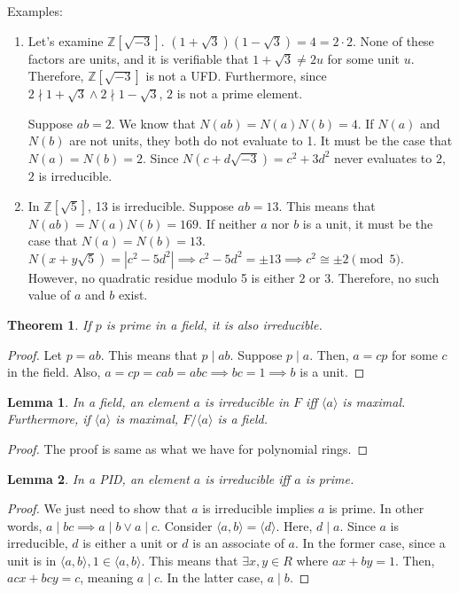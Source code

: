 \documentclass{article}
\theoremstyle{definition}
\theoremstyle{plain}
\newtheorem{theorem}{Theorem}
\theoremstyle{corollary}
\theoremstyle{lemma}
\newtheorem{lemma}{Lemma}
\begin{document}
Examples:
\begin{enumerate}
    \item Let's examine $\mathbb{Z}[\sqrt{-3}]$. $(1+\sqrt3)(1-\sqrt3)=4=2\cdot2$. None of these factors are units, and it is verifiable that $1+\sqrt3\neq2u$ for some unit $u$. Therefore, $\mathbb{Z}[\sqrt{-3}]$ is not a UFD. Furthermore, since $2\nmid 1+\sqrt3\land2\nmid1-\sqrt3$, $2$ is not a prime element.

    Suppose $ab=2$. We know that $N(ab)=N(a)N(b)=4$. If $N(a)$ and $N(b)$ are not units, they both do not evaluate to 1. It must be the case that $N(a)=N(b)=2$. Since $N(c+d\sqrt{-3})=c^2+3d^2$ never evaluates to $2$, $2$ is irreducible.
    \item In $\mathbb{Z}[\sqrt5]$, 13 is irreducible. Suppose $ab=13$. This means that $N(ab)=N(a)N(b)=169$. If neither $a$ nor $b$ is a unit, it must be the case that $N(a)=N(b)=13$. $N(x+y\sqrt5)=|c^2-5d^2|\implies c^2-5d^2=\pm13\implies c^2\cong\pm2\pmod5$. However, no quadratic residue modulo 5 is either $2$ or $3$. Therefore, no such value of $a$ and $b$ exist.
\end{enumerate}

\begin{theorem}
    If $p$ is prime in a field, it is also irreducible.
\end{theorem}

\begin{proof}
    Let $p=ab$. This means that $p\mid ab$. Suppose $p\mid a$. Then, $a=cp$ for some $c$ in the field. Also, $a=cp=cab=abc\implies bc=1\implies b$ is a unit.
\end{proof}

\begin{lemma}
    In a field, an element $a$ is irreducible in $F$ iff $\langle a\rangle$ is maximal. Furthermore, if $\langle a\rangle$ is maximal, $F/\langle a\rangle$ is a field.
\end{lemma}

\begin{proof}
    The proof is same as what we have for polynomial rings.
\end{proof}

\begin{lemma}
    In a PID, an element $a$ is irreducible iff $a$ is prime.
\end{lemma}

\begin{proof}
    We just need to show that $a$ is irreducible implies $a$ is prime. In other words, $a\mid bc\implies a\mid b\lor a\mid c$. Consider $\langle a,b\rangle=\langle d\rangle$. Here, $d\mid a$. Since $a$ is irreducible, $d$ is either a unit or $d$ is an associate of $a$. In the former case, since a unit is in $\langle a,b\rangle, 1\in\langle a,b\rangle$. This means that $\exists x,y\in R$ where $ax+by=1$. Then, $acx+bcy=c$, meaning $a\mid c$. In the latter case, $a\mid b$.
\end{proof}
\end{document}
